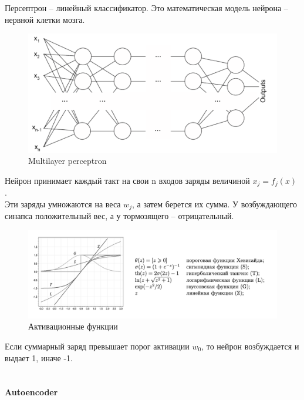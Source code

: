         
        Персептрон – линейный классификатор. Это математическая модель нейрона -- нервной клетки мозга. \\
        \begin{figure}[h!]
                \centering
                \includegraphics[scale=0.4]{pictures/perseptron.png}
                \caption{Multilayer perceptron}
                \label{fig:my_label}
            \end{figure} 
        \par
        Нейрон принимает каждый такт на свои n входов заряды величиной $x_j = f_j (x)$ . \\ 
        Эти заряды умножаются на веса $w_j$, а затем берется их сумма. У возбуждающего синапса положительный вес, а у тормозящего -- отрицательный. \\
        \begin{figure}[h!]
                \centering
                \includegraphics[scale=0.6]{pictures/activation.png}
                \caption{Активационные функции}
                \label{fig:my_label}
            \end{figure} 
        \par
        Если суммарный заряд превышает порог активации $w_0$, то нейрон возбуждается и выдает 1, иначе -1.\\ \\
        \newpage
        \paragraph
        {
        Autoencoder
        }
        \noindent\\
        
